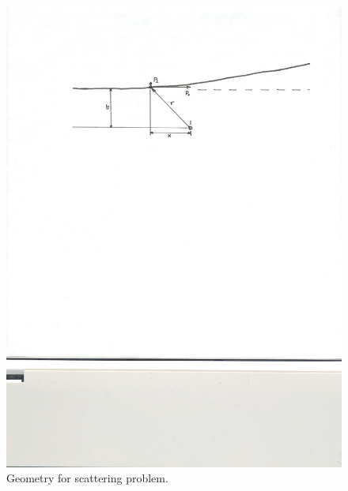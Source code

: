 \begin{figure}[htbp]
\includegraphics[width=\textwidth]{Figures/scattering}
\caption{Geometry for scattering problem.}
\label{f.scattering}
\end{figure}

